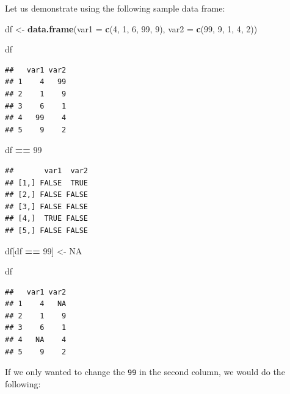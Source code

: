\documentclass[
]{book}
\newenvironment{Shaded}{\begin{snugshade}}{\end{snugshade}}
\newcommand{\AttributeTok}[1]{\textcolor[rgb]{0.13,0.29,0.53}{#1}}
\newcommand{\ConstantTok}[1]{\textcolor[rgb]{0.56,0.35,0.01}{#1}}
\newcommand{\DecValTok}[1]{\textcolor[rgb]{0.00,0.00,0.81}{#1}}
\newcommand{\FunctionTok}[1]{\textcolor[rgb]{0.13,0.29,0.53}{\textbf{#1}}}
\newcommand{\NormalTok}[1]{#1}
\newcommand{\OtherTok}[1]{\textcolor[rgb]{0.56,0.35,0.01}{#1}}
\newcommand{\SpecialCharTok}[1]{\textcolor[rgb]{0.81,0.36,0.00}{\textbf{#1}}}
\begin{document}
Let us demonstrate using the following sample data frame:

\begin{Shaded}
\begin{Highlighting}[]
\NormalTok{df }\OtherTok{\textless{}{-}} \FunctionTok{data.frame}\NormalTok{(}\AttributeTok{var1 =} \FunctionTok{c}\NormalTok{(}\DecValTok{4}\NormalTok{, }\DecValTok{1}\NormalTok{, }\DecValTok{6}\NormalTok{, }\DecValTok{99}\NormalTok{, }\DecValTok{9}\NormalTok{), }
                 \AttributeTok{var2 =} \FunctionTok{c}\NormalTok{(}\DecValTok{99}\NormalTok{, }\DecValTok{9}\NormalTok{, }\DecValTok{1}\NormalTok{, }\DecValTok{4}\NormalTok{, }\DecValTok{2}\NormalTok{))}

\NormalTok{df}
\end{Highlighting}
\end{Shaded}

\begin{verbatim}
##   var1 var2
## 1    4   99
## 2    1    9
## 3    6    1
## 4   99    4
## 5    9    2
\end{verbatim}

\begin{Shaded}
\begin{Highlighting}[]
\NormalTok{df }\SpecialCharTok{==} \DecValTok{99}
\end{Highlighting}
\end{Shaded}

\begin{verbatim}
##       var1  var2
## [1,] FALSE  TRUE
## [2,] FALSE FALSE
## [3,] FALSE FALSE
## [4,]  TRUE FALSE
## [5,] FALSE FALSE
\end{verbatim}

\begin{Shaded}
\begin{Highlighting}[]
\NormalTok{df[df }\SpecialCharTok{==} \DecValTok{99}\NormalTok{] }\OtherTok{\textless{}{-}} \ConstantTok{NA}

\NormalTok{df}
\end{Highlighting}
\end{Shaded}

\begin{verbatim}
##   var1 var2
## 1    4   NA
## 2    1    9
## 3    6    1
## 4   NA    4
## 5    9    2
\end{verbatim}

If we only wanted to change the \texttt{99} in the second column, we would do the following:
\end{document}
